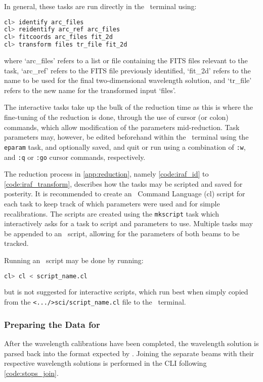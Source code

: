 {\noindent In} general, these tasks are run directly in the \iraf\ terminal using:

\begin{lstlisting}[language=bash]
cl> identify arc_files
cl> reidentify arc_ref arc_files
cl> fitcoords arc_files fit_2d
cl> transform files tr_file fit_2d
\end{lstlisting}
{\parskip=0pt where} `arc\_files' refers to a list or file containing the \gls{FITS} files relevant to the task, `arc\_ref' refers to the \gls{FITS} file previously identified, `fit\_2d' refers to the name to be used for the final two-dimensional wavelength solution, and `tr\_file' refers to the new name for the transformed input `files'.

The interactive tasks take up the bulk of the reduction time as this is where the fine-tuning of the reduction is done, through the use of cursor (or colon) commands, which allow modification of the parameters mid-reduction.
Task parameters may, however, be edited beforehand within the \iraf\ terminal using the \texttt{eparam} task, and optionally saved, and quit or run using a combination of \texttt{:w}, and \texttt{:q} or \texttt{:go} cursor commands, respectively.

The reduction process in \autoref{app:reduction}, namely \autoref{code:iraf_id} to \ref{code:iraf_transform}, describes how the tasks may be scripted and saved for posterity.
It is recommended to create an \iraf\ Command Language (cl) script for each task to keep track of which parameters were used and for simple recalibrations.
The scripts are created using the \texttt{mkscript} task which interactively asks for a task to script and parameters to use.
Multiple tasks may be appended to an \iraf\ script, allowing for the parameters of both beams to be tracked.

Running an \iraf\ script may be done by running:
\begin{lstlisting}[language=bash]
cl> cl < script_name.cl
\end{lstlisting}
{\parskip=0pt but} is not suggested for interactive scripts, which run best when simply copied from the \texttt{<.../>sci/script\_name.cl} file to the \iraf\ terminal.

\subsubsection{Preparing the Data for \polsalt}

After the wavelength calibrations have been completed, the wavelength solution is parsed back into the format expected by \polsalt.
Joining the separate beams with their respective wavelength solutions is performed in the \gls{CLI} following \autoref{code:stops_join}.

